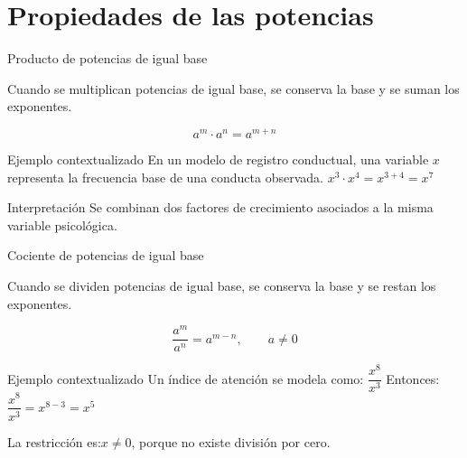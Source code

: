 \documentclass[handout,aspectratio=169]{beamer}
\begin{document}
	\section{Propiedades de las potencias}
	
	\begin{frame}{Producto de potencias de igual base}
		\begin{idea}
			Cuando se multiplican potencias de igual base, se conserva la base y se suman los exponentes.
		\end{idea}
		
		\[
		a^m\cdot a^n=a^{m+n}
		\]
		
		\pause
		
		\begin{exampleblock}{Ejemplo contextualizado}
			En un modelo de registro conductual, una variable \(x\) representa la frecuencia base de una conducta observada. 
			$x^3\cdot x^4=x^{3+4}=x^7$			
		\end{exampleblock}
		
		\pause
		
		\begin{block}{Interpretación}
			Se combinan dos factores de crecimiento asociados a la misma variable psicológica.
		\end{block}
	\end{frame}
	
	
	\begin{frame}{Cociente de potencias de igual base}
		\begin{idea}
			Cuando se dividen potencias de igual base, se conserva la base y se restan los exponentes.
		\end{idea}		
		\[
		\frac{a^m}{a^n}=a^{m-n},
		\qquad a\neq 0
		\]
		
		\pause
		
		\begin{exampleblock}{Ejemplo contextualizado}
			Un índice de atención se modela como: $\dfrac{x^8}{x^3}$
			Entonces: $\dfrac{x^8}{x^3}=x^{8-3}=x^5$
		\end{exampleblock}
		
		\pause
		
		\begin{alerta}
			La restricción es:$x\neq 0$, porque no existe división por cero.
		\end{alerta}
	\end{frame}
	
\end{document}
